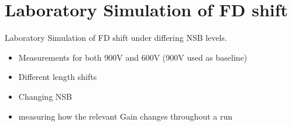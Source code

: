 \chapter[Laboratory Simulation of FD shift]{\centering Laboratory Simulation of FD shift \\}\label{Ch:LabPMTshift}

Laboratory Simulation of FD shift under differing NSB levels.
\begin{itemize}
\item Measurements for both 900V and 600V (900V used as baseline)
\item Different length shifts
\item Changing NSB
\item measuring how the relevant Gain changes throughout a run
\end{itemize}